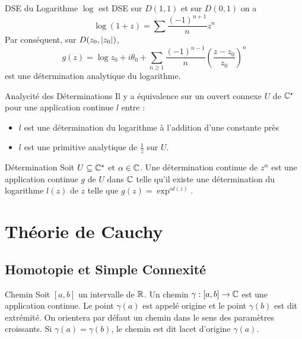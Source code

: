 \documentclass{cours}
\begin{document}
\begin{propositionfr}{DSE du Logarithme}{}
    $\log$ est DSE sur $D(1, 1)$ et sur $D(0, 1)$ on a
    \[
        \log(1 + z) = \sum \frac{(-1)^{n + 1}}{n}z^{n}
    \]
    Par conséquent, sur $D(z_{0}, \left|z_{0}\right|)$, 
    \[
        g(z) = \log z_{0} + i\theta_{0} + \sum_{n \geq 1}\frac{(-1)^{n - 1}}{n}\left(\frac{z - z_{0}}{z_{0}}\right)^{n}
    \]
    est une détermination analytique du logarithme. 
\end{propositionfr}
\begin{propositionfr}{Analycité des Déterminations}{}
    Il y a équivalence sur un ouvert connexe $U$ de $\mathbb{C}^{\star}$ pour une application continue $l$ entre : 
    \begin{itemize}
        \item $l$ est une détermination du logarithme à l'addition d'une constante près
        \item $l$ est une primitive analytique de $\frac{1}{z}$ sur $U$. 
    \end{itemize}
\end{propositionfr}

\begin{définition}{Détermination}{}
    Soit $U \subseteq \mathbb{C}^{\star}$ et $\alpha \in \mathbb{C}$. Une détermination continue de $z^{\alpha}$ est une application continue $g$ de $U$ dans $\mathbb{C}$ telle qu'il existe une détermination du logarithme $l(z)$ de $z$ telle que $g(z) = \exp^{\alpha l(z)}$.
\end{définition}

\section{Théorie de Cauchy}
\subsection{Homotopie et Simple Connexité}
\begin{définition}{Chemin}{}
    Soit $\left[a, b\right]$ un intervalle de $\mathbb{R}$. Un chemin $\gamma: \left[a, b\right] \to \mathbb{C}$ est une application continue. Le point $\gamma(a)$ est appelé origine et le point $\gamma(b)$ est dit extrémité. On orientera par défaut un chemin dans le sens des paramètres croissants. Si $\gamma(a) = \gamma(b)$, le chemin est dit lacet d'origine $\gamma(a)$.
\end{définition}
\end{document}
